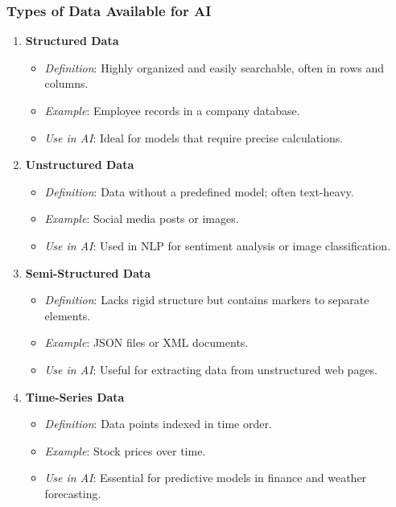 \documentclass[aspectratio=169]{beamer}
\begin{document}
\begin{frame}[fragile]
    \frametitle{Types of Data Available for AI}
    \begin{enumerate}
        \item \textbf{Structured Data}
            \begin{itemize}
                \item \textit{Definition}: Highly organized and easily searchable, often in rows and columns.
                \item \textit{Example}: Employee records in a company database.
                \item \textit{Use in AI}: Ideal for models that require precise calculations.
            \end{itemize}
        \item \textbf{Unstructured Data}
            \begin{itemize}
                \item \textit{Definition}: Data without a predefined model; often text-heavy.
                \item \textit{Example}: Social media posts or images.
                \item \textit{Use in AI}: Used in NLP for sentiment analysis or image classification.
            \end{itemize}
        \item \textbf{Semi-Structured Data}
            \begin{itemize}
                \item \textit{Definition}: Lacks rigid structure but contains markers to separate elements.
                \item \textit{Example}: JSON files or XML documents.
                \item \textit{Use in AI}: Useful for extracting data from unstructured web pages.
            \end{itemize}
        \item \textbf{Time-Series Data}
            \begin{itemize}
                \item \textit{Definition}: Data points indexed in time order.
                \item \textit{Example}: Stock prices over time.
                \item \textit{Use in AI}: Essential for predictive models in finance and weather forecasting.
            \end{itemize}
    \end{enumerate}
\end{frame}
\end{document}
